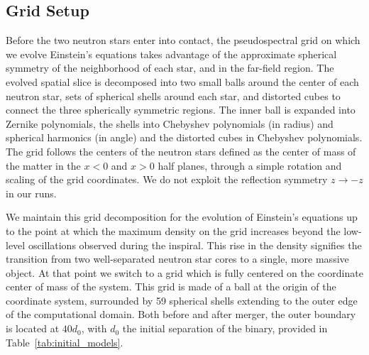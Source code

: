 \subsection{Grid Setup}

Before the two neutron stars enter into contact, the pseudospectral grid on which we evolve Einstein's equations takes advantage of the approximate spherical symmetry of the neighborhood of each star, and in the far-field region. The evolved spatial slice is decomposed into two small balls around the center of each neutron star, sets of spherical shells around each star, and distorted cubes to connect the three spherically symmetric regions. The inner ball is expanded into Zernike polynomials, the shells into Chebyshev polynomials (in radius) and spherical harmonics (in angle) and the distorted cubes in Chebyshev polynomials. The grid follows the centers of the neutron stars defined as the center of mass of the matter in the $x < 0$ and $x > 0$ half planes, through a simple rotation and scaling of the grid coordinates. We do not exploit the reflection symmetry $z \rightarrow -z$ in our runs.

We maintain this grid decomposition for the evolution of Einstein's equations up to the point at which the maximum density on the grid increases beyond the low-level oscillations observed during the inspiral. This rise in the density signifies the transition from two well-separated neutron star cores to a single, more massive object. At that point we switch to a grid which is fully centered on the coordinate center of mass of the system. This grid  is made of a ball at the origin of the coordinate system, surrounded by 59 spherical shells extending to the outer edge of the computational domain. Both before and after merger, the outer boundary is located at $40d_0$, with $d_0$ the initial separation of the binary, provided in Table~\ref{tab:initial_models}.

